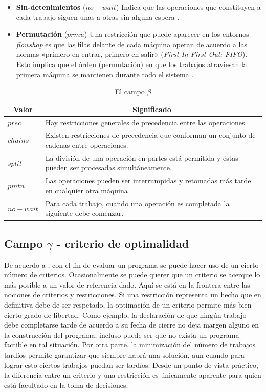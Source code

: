 \documentclass[spanish,draft,12pt,headsepline,footsepline,paper=letter]{scrreprt}
\begin{document}
\begin{itemize}
  \item \textbf{Sin-detenimientos} ($no-wait$) Indica que las operaciones que constituyen a cada trabajo siguen unas a otras sin alguna espera \citep[p.~11]{TKindt2002}.
  \item \textbf{Permutación} ($prmu$) Una restricción que puede aparecer en los entornos \textit{flowshop} es que las filas delante de cada máquina operan de acuerdo a las normas «primero en entrar, primero en salir» (\textit{First In First Out; FIFO}). Esto implica que el órden (permutación) en que los trabajos atraviesan la primera máquina se mantienen durante todo el sistema \citep[p.~17]{Pinedo1995}.
\end{itemize}

\begin{table}
\centering
\begin{tabular}{l p{12cm}}
\toprule
  \multicolumn{1}{c}{Valor} & \multicolumn{1}{c}{Significado} \\
  \midrule
  $prec$    & Hay restricciones generales de precedencia entre las operaciones.                                    \\
  $chains$  & Existen restricciones de precedencia que conforman un conjunto de cadenas entre operaciones.         \\
  $split$   & La división de una operación en partes está permitida y éstas pueden ser procesadas simultáneamente. \\
  $pmtn$    & Las operaciones pueden ser interrumpidas y retomadas más tarde en cualquier otra máquina             \\
  $no-wait$ & Para cada trabajo, cuando una operación es completada la siguiente debe comenzar.                    \\
  \bottomrule
\end{tabular}
\caption{El campo $\beta$}
\label{tab:notation_beta}
\end{table}

\subsection{Campo $\gamma$ - criterio de optimalidad}

De acuerdo a \citet[p.~12]{TKindt2002}, con el fin de evaluar un programa se puede hacer uso de un cierto número de criterios. Ocasionalmente se puede querer que un criterio se acerque lo más posible a un valor de referencia dado. Aquí se está en la frontera entre las nociones de criterios y restricciones. Si una restricción representa un hecho que en definitiva debe de ser respetado, la optimación de un criterio permite más bien cierto grado de libertad. Como ejemplo, la declaración de que ningún trabajo debe completarse tarde de acuerdo a su fecha de cierre no deja margen alguno en la construcción del programa; incluso puede ser que no exista un programa factible en tal situación. Por otra parte, la minimización del número de trabajos tardíos permite garantizar que siempre habrá una solución, aun cuando para lograr esto ciertos trabajos puedan ser tardíos. Desde un punto de vista práctico, la diferencia entre un criterio y una restricción es únicamente aparente para quien está facultado en la toma de decisiones.
\end{document}
